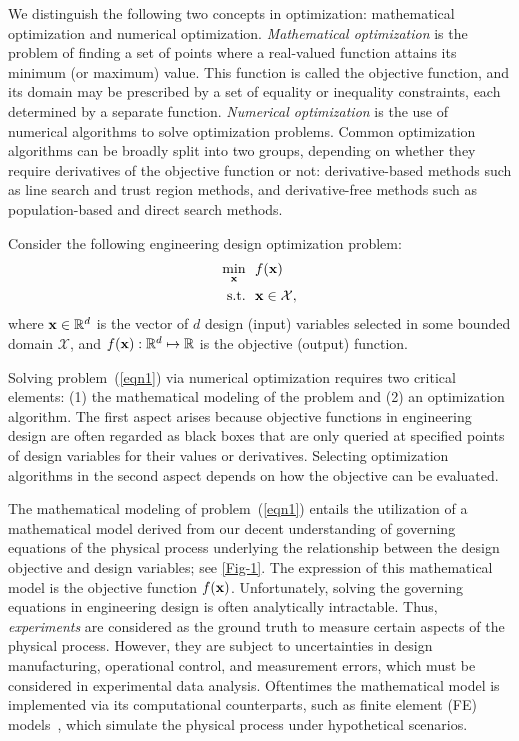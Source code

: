 \documentclass[journal ]{new-aiaa}
\begin{document}
We distinguish the following two concepts in optimization: mathematical optimization and numerical optimization.
\textit{Mathematical optimization} is the problem of finding a set of points where a real-valued function attains its minimum (or maximum) value.
This function is called the objective function, and its domain may be prescribed by a set of equality or inequality constraints, each determined by a separate function.
\textit{Numerical optimization} is the use of numerical algorithms to solve optimization problems.
Common optimization algorithms can be broadly split into two groups, depending on whether they require derivatives of the objective function or not: derivative-based methods such as line search and trust region methods, and derivative-free methods such as population-based and direct search methods.

Consider the following engineering design optimization problem:
\begin{equation}\label{eqn1}
	\begin{aligned}
		\underset{\bf x}{\min} \ \ & f(\bf x)\\
		\textrm{s.t.} \ \ 
		& \bf x \in \mathcal{X}, 
	\end{aligned}
\end{equation} 
where ${\bf x} \in \mathbb{R}^d$ is the vector of $d$ design (input) variables selected in some bounded domain $\mathcal{X}$, and $f({\bf x}):\mathbb{R}^d \mapsto \mathbb{R}$ is the objective (output) function.

Solving problem~(\ref{eqn1}) via numerical optimization requires two critical elements: (1) the mathematical modeling of the problem and (2) an optimization algorithm.
The first aspect arises because objective functions in engineering design are often regarded as black boxes that are only queried at specified points of design variables for their values or derivatives.
Selecting optimization algorithms in the second aspect depends on how the objective can be evaluated. 

The mathematical modeling of problem~(\ref{eqn1}) entails the utilization of a mathematical model derived from our decent understanding of governing equations of the physical process underlying the relationship between the design objective and design variables; see \cref{Fig-1}.
The expression of this mathematical model is the objective function $f(\bf x)$.
Unfortunately, solving the governing equations in engineering design is often analytically intractable.
Thus, \textit{experiments} are considered as the ground truth to measure certain aspects of the physical process.
However, they are subject to uncertainties in design manufacturing, operational control, and measurement errors, which must be considered in experimental data analysis.
Oftentimes the mathematical model is implemented via its computational counterparts, such as finite element (FE) models~\citep{Bathe2006}, which simulate the physical process under hypothetical scenarios.
\end{document}
